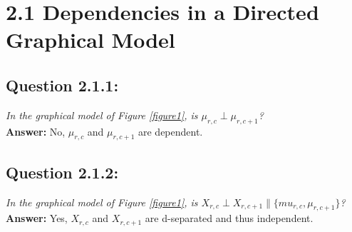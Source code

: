 \section*{2.1 Dependencies in a Directed Graphical Model}

\subsection*{Question 2.1.1:}
\textit{In the graphical model of Figure \ref{figure1}, is $\mu_{r,c} \perp \mu_{r,c+1}$?}
\\

\textbf{Answer:} No, $\mu_{r,c}$ and $\mu_{r,c+1}$ are dependent.

\subsection*{Question 2.1.2:}
\textit{In the graphical model of Figure \ref{figure1}, is $X_{r,c} \perp X_{r,c+1} \| \{mu_{r,c}, \mu_{r,c+1} \}$?}
\\

\textbf{Answer:} Yes, $X_{r,c}$ and $X_{r,c+1}$ are d-separated and thus independent.
